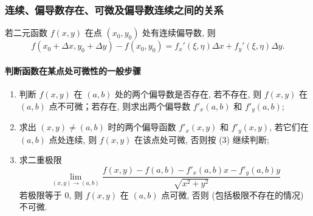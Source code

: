 \subsubsection{连续、偏导数存在、可微及偏导数连续之间的关系}

\begin{figure}[H]
    \centering
    \caption{}
\end{figure}

\begin{theorem}[连续偏导数]
    若二元函数 $f(x,y)$ 在点 $(x_0,y_0)$ 处有连续偏导数, 则 
    $$
    f(x_0+\Delta x,y_0+\Delta y)-f(x_0,y_0)=f_x'(\xi,\eta)\Delta x+f_y'(\xi, \eta)\Delta y.
    $$
\end{theorem}

\paragraph{判断函数在某点处可微性的一般步骤}
\begin{enumerate}[label=(\arabic{*})]
    \item 判断 $f(x,y)$ 在 $(a,b)$ 处的两个偏导数是否存在, 若不存在, 则 $f(x,y)$ 在 $(a,b)$ 点不可微；若存在, 则求出两个偏导数 $f'_x(a,b)$ 和 $f'_y(a,b)$;
    \item 求出 $(x,y)\neq (a,b)$ 时的两个偏导函数 $f'_x(x,y)$ 和 $f'_y(x,y)$, 若它们在 $(a,b)$ 点处连续, 则 $f(x,y)$ 在该点处可微, 否则按 (3) 继续判断;
    \item 求二重极限 $$\lim_{(x,y)\to(a,b)}\dfrac{f(x,y)-f(a,b)-f'_x(a,b)x-f'_y(a,b)y}{\sqrt{x^2+y^2}}$$ 若极限等于 0, 则 $f(x,y)$ 在 $(a,b)$ 点可微, 否则 (包括极限不存在的情况) 不可微.
\end{enumerate}

